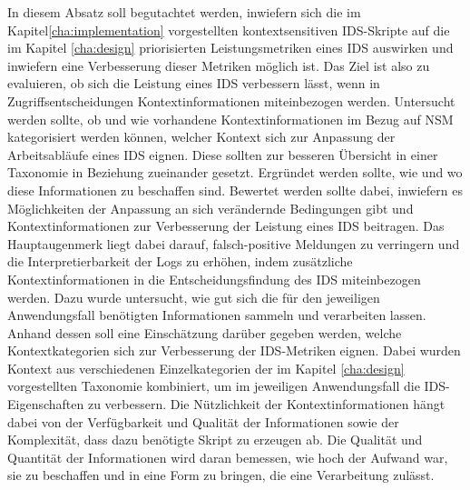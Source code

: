 In diesem Absatz soll begutachtet werden, inwiefern sich die im Kapitel\ref{cha:implementation} vorgestellten kontextsensitiven IDS-Skripte auf die im Kapitel \ref{cha:design} priorisierten Leistungsmetriken eines IDS auswirken und inwiefern eine Verbesserung dieser Metriken möglich ist. Das Ziel ist also zu evaluieren, ob sich die Leistung eines IDS verbessern lässt, wenn in Zugriffsentscheidungen Kontextinformationen miteinbezogen werden.
Untersucht werden sollte, ob und wie vorhandene Kontextinformationen im Bezug auf NSM kategorisiert werden können, welcher Kontext sich zur Anpassung der Arbeitsabläufe eines IDS eignen. Diese sollten zur besseren Übersicht in einer Taxonomie in Beziehung zueinander gesetzt.
Ergründet werden sollte, wie und wo diese Informationen zu beschaffen sind.
Bewertet werden sollte dabei, inwiefern es Möglichkeiten der Anpassung an sich verändernde Bedingungen gibt und Kontextinformationen zur Verbesserung der Leistung eines IDS beitragen.
Das Hauptaugenmerk liegt dabei darauf, falsch-positive Meldungen zu verringern und die Interpretierbarkeit der Logs zu erhöhen, indem zusätzliche Kontextinformationen in die Entscheidungsfindung des IDS miteinbezogen werden. Dazu wurde untersucht, wie gut sich die für den jeweiligen Anwendungsfall benötigten Informationen sammeln und verarbeiten lassen. Anhand dessen soll eine Einschätzung darüber gegeben werden, welche Kontextkategorien sich zur Verbesserung der IDS-Metriken eignen.
Dabei wurden Kontext aus verschiedenen Einzelkategorien der im Kapitel \ref{cha:design} vorgestellten Taxonomie kombiniert, um im jeweiligen Anwendungsfall die IDS-Eigenschaften zu verbessern.
Die Nützlichkeit der Kontextinformationen hängt dabei von der Verfügbarkeit und Qualität der Informationen sowie der Komplexität, dass dazu benötigte Skript zu erzeugen ab. 
Die Qualität und Quantität der Informationen wird daran bemessen, wie hoch der Aufwand war, sie zu beschaffen und in eine Form zu bringen, die eine Verarbeitung zulässt.





